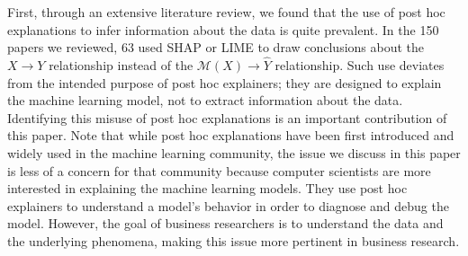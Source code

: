 \documentclass[12pt]{article}  %
\begin{document}
            First, through an extensive literature review, we found that the use of post hoc explanations to infer information about the data is quite prevalent. In the 150 papers we reviewed, 63 used SHAP or LIME to draw conclusions about the $X\rightarrow Y$ relationship instead of the $\mathcal{M}(X)\rightarrow \hat{Y}$ relationship. Such use deviates from the intended purpose of post hoc explainers; they are designed to explain the machine learning model, not to extract information about the data. Identifying this misuse of post hoc explanations is an important contribution of this paper. Note that while post hoc explanations have been first introduced and widely used in the machine learning community, the issue we discuss in this paper is less of a concern for that community because computer scientists are more interested in explaining the machine learning models. They use post hoc explainers to understand a model's behavior in order to diagnose and debug the model. However, the goal of business researchers is to understand the data and the underlying phenomena, making this issue more pertinent in business research.

\end{document}
